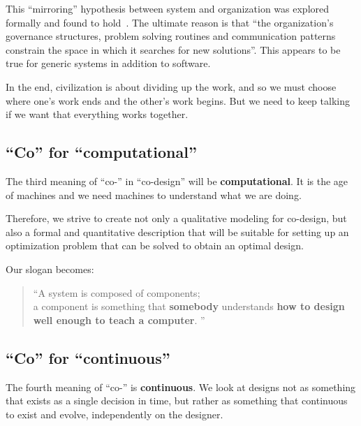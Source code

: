 This ``mirroring'' hypothesis between system and organization was explored formally and found to hold~\cite{maccormack12exploring}.
The ultimate reason is that ``the organization's governance structures, problem solving routines and communication patterns constrain the space in which it searches for new solutions''.
This appears to be true for generic systems in addition to software.

In the end, civilization is about dividing up the work, and so we must choose where one's work ends and the other's work begins.
But we need to keep talking if we want that everything works together.

\subsection{``Co'' for ``computational''}

The third meaning of ``co-'' in ``co-design'' will be \textbf{computational}.
It is the age of machines and we need machines to understand what we are doing.

Therefore, we strive to create not only a qualitative modeling for co-design, but also a formal and quantitative description that will be suitable for setting up an optimization problem that can be solved to obtain an optimal design.

Our slogan becomes:

\begin{quote}
    \enquote{A system is composed of components;\\
        a component is something that \textbf{somebody} understands
        \textbf{how to design} \textbf{well enough to teach a computer}.
    }
\end{quote}

\subsection{``Co'' for ``continuous''}

The fourth meaning of ``co-'' is \textbf{continuous}.
We look at designs not as something that exists as a single decision in time, but rather as something that continuous to exist and evolve, independently on the designer.


